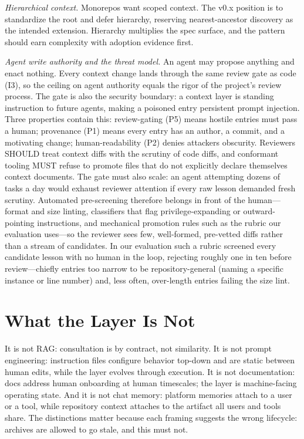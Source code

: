 \documentclass[sigconf,screen]{acmart}
\begin{document}
\emph{Hierarchical context.} Monorepos want scoped context. The v0.x position is
to standardize the root and defer hierarchy, reserving nearest-ancestor discovery
as the intended extension. Hierarchy multiplies the spec surface, and the pattern
should earn complexity with adoption evidence first.

\emph{Agent write authority and the threat model.} An agent may propose anything
and enact nothing. Every context change lands through the same review gate as code
(I3), so the ceiling on agent authority equals the rigor of the project's review
process. The gate is also the security boundary: a context layer is standing
instruction to future agents, making a poisoned entry persistent prompt injection.
Three properties contain this: review-gating (P5) means hostile entries must pass a
human; provenance (P1) means every entry has an author, a commit, and a motivating
change; human-readability (P2) denies attackers obscurity. Reviewers SHOULD treat
context diffs with the scrutiny of code diffs, and conformant tooling MUST refuse
to promote files that do not explicitly declare themselves context documents. The
gate must also scale: an agent attempting dozens of tasks a day would exhaust
reviewer attention if every raw lesson demanded fresh scrutiny. Automated
pre-screening therefore belongs in front of the human---format and size linting,
classifiers that flag privilege-expanding or outward-pointing instructions, and
mechanical promotion rules such as the rubric our evaluation uses---so the reviewer
sees few, well-formed, pre-vetted diffs rather than a stream of candidates. In our
evaluation such a rubric screened every candidate lesson with no human in the loop,
rejecting roughly one in ten before review---chiefly entries too narrow to be
repository-general (naming a specific instance or line number) and, less often,
over-length entries failing the size lint.

\section{What the Layer Is Not}
It is not RAG: consultation is by contract, not similarity. It is not prompt
engineering: instruction files configure behavior top-down and are static between
human edits, while the layer evolves through execution. It is not documentation:
docs address human onboarding at human timescales; the layer is machine-facing
operating state. And it is not chat memory: platform memories attach to a user or
a tool, while repository context attaches to the artifact all users and tools
share. The distinctions matter because each framing suggests the wrong lifecycle:
archives are allowed to go stale, and this must not.
\end{document}
